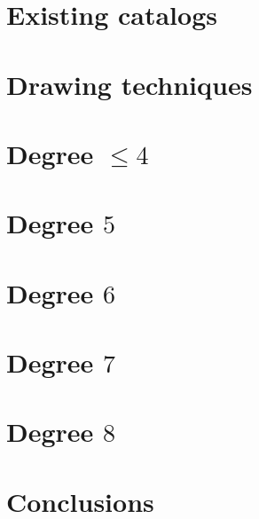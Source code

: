 \documentclass{amsart}
\numberwithin{equation}{section}
\theoremstyle{definition}
\theoremstyle{remark}
\begin{document}
\section{Existing catalogs}{\label{sec:catalogs}
}
\section{Drawing techniques}{\label{sec:drawing}
}
\section{Degree $\leq 4$}{
}
\section{Degree $5$}{
}
\section{Degree $6$}{
}
\section{Degree $7$}{
}
\section{Degree $8$}{
}
\section{Conclusions}{\label{sec:conclusions}
}

\nocite{*}







\end{document}
